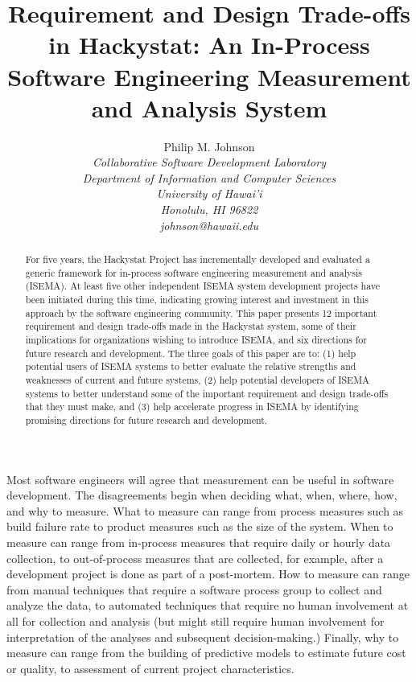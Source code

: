 \documentclass[10pt,twocolumn]{article}
\begin{document}
\title{Requirement and Design Trade-offs in Hackystat: An In-Process
Software Engineering Measurement and Analysis System}

\author{Philip M. Johnson \\
\em  Collaborative Software Development Laboratory \\
\em  Department of Information and Computer Sciences \\
\em  University of Hawai'i \\
\em  Honolulu, HI 96822 \\
\em  johnson@hawaii.edu \\
}
\maketitle
\thispagestyle{empty}

\begin{abstract}
For five years, the Hackystat Project has incrementally developed and
evaluated a generic framework for in-process software engineering
measurement and analysis (ISEMA). At least five other independent ISEMA
system development projects have been initiated during this time,
indicating growing interest and investment in this approach by the software
engineering community.  This paper presents 12 important requirement and
design trade-offs made in the Hackystat system, some of their implications
for organizations wishing to introduce ISEMA, and six directions for future
research and development. The three goals of this paper are to: (1) help
potential users of ISEMA systems to better evaluate the relative strengths
and weaknesses of current and future systems, (2) help potential developers
of ISEMA systems to better understand some of the important requirement and
design trade-offs that they must make, and (3) help accelerate progress in
ISEMA by identifying promising directions for future research and
development.
\end{abstract}

\label{sec:intro}
Most software engineers will agree that measurement can be useful in
software development.  The disagreements begin when deciding what, when,
where, how, and why to measure.  What to measure can range from process
measures such as build failure rate to product measures such as the size
of the system.  When to measure can range from in-process measures that
require daily or hourly data collection, to out-of-process measures that
are collected, for example, after a development project is done as part of
a post-mortem.  How to measure can range from manual techniques that
require a software process group to collect and analyze the data, to
automated techniques that require no human involvement at all for
collection and analysis (but might still require human involvement for
interpretation of the analyses and subsequent decision-making.)  Finally,
why to measure can range from the building of predictive models to estimate
future cost or quality, to assessment of current project
characteristics.
\end{document}

